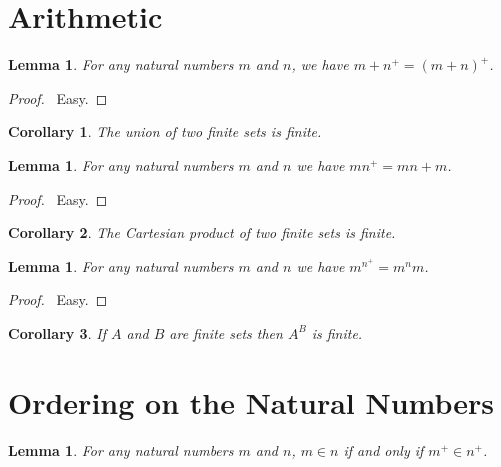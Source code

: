 \documentclass{report}
\let\qed\relax
\newtheorem{lemma}[axiom]{Lemma}
\newtheorem{corollary}{Corollary}[axiom]
\theoremstyle{definition}
\begin{document}
    \section{Arithmetic}

    \begin{lemma}
        For any natural numbers $m$ and $n$, we have $m + n^+ = (m+n)^+$.
    \end{lemma}

    \begin{proof}
        \pf\ Easy. \qed
    \end{proof}

    \begin{corollary}
        The union of two finite sets is finite.
    \end{corollary}

    \begin{lemma}
        For any natural numbers $m$ and $n$ we have $m n^+ = mn + m$.
    \end{lemma}

    \begin{proof}
        \pf\ Easy. \qed
    \end{proof}

    \begin{corollary}
        The Cartesian product of two finite sets is finite.
    \end{corollary}

    \begin{lemma}
        For any natural numbers $m$ and $n$ we have $m^{n^+} = m^n m$.
    \end{lemma}

    \begin{proof}
        \pf\ Easy. \qed
    \end{proof}

    \begin{corollary}
        If $A$ and $B$ are finite sets then $A^B$ is finite.
    \end{corollary}

    \section{Ordering on the Natural Numbers}

    \begin{lemma}
        \label{lemma:natural_number_order_successor}
        For any natural numbers $m$ and $n$, $m \in n$ if and only if $m^+ \in n^+$.
    \end{lemma}
\end{document}
